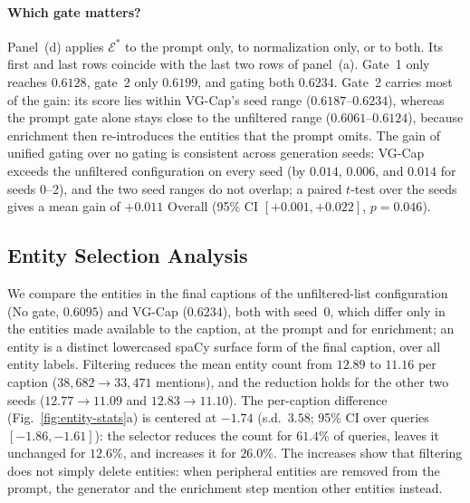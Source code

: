 \documentclass[runningheads]{llncs}
\DeclareRobustCommand{\aciids}[1]{{\color{olive}#1}}
\DeclareRobustCommand{\revise}[1]{{\color{olive}#1}}
\DeclareRobustCommand{\aciids}[1]{#1}
\DeclareRobustCommand{\revise}[1]{#1}
\begin{document}
\paragraph{\aciids{Which gate matters?}} \aciids{Panel~(d) applies $\mathcal{E}^{*}$ to the prompt only, to normalization only, or to both. Its first and last rows coincide with the last two rows of panel~(a).} Gate~1 only reaches $0.6128$, gate~2 only $0.6199$, and gating both $0.6234$. \revise{Gate~2 carries most of the gain: its score lies within VG-Cap's seed range ($0.6187$--$0.6234$), whereas the prompt gate alone stays close to the unfiltered range ($0.6061$--$0.6124$), because enrichment then re-introduces the entities that the prompt omits. The gain of unified gating over no gating is consistent across generation seeds: VG-Cap exceeds the unfiltered configuration on every seed (by $0.014$, $0.006$, and $0.014$ for seeds 0--2), and the two seed ranges do not overlap; a paired $t$-test over the seeds gives a mean gain of $+0.011$ Overall (95\% CI $[+0.001,+0.022]$, $p=0.046$).}

\subsection{Entity Selection Analysis}
\label{sec:entity-stats}

\aciids{We compare the entities in the final captions of the unfiltered-list configuration (No gate, $0.6095$) and VG-Cap ($0.6234$), both with seed~0, which differ only in the entities made available to the caption, at the prompt and for enrichment;} \revise{an entity is a distinct lowercased spaCy surface form of the final caption, over all entity labels.} Filtering reduces the mean entity count from \revise{$12.89$ to $11.16$ per caption ($38{,}682\rightarrow33{,}471$ mentions), and the reduction holds for the other two seeds ($12.77\rightarrow11.09$ and $12.83\rightarrow11.10$). The per-caption difference (Fig.~\ref{fig:entity-stats}a) is centered at $-1.74$ (s.d.\ $3.58$; 95\% CI over queries $[-1.86,-1.61]$): the selector reduces the count for $61.4\%$ of queries, leaves it unchanged for $12.6\%$, and increases it for $26.0\%$.} \aciids{The increases show that filtering does not simply delete entities: when peripheral entities are removed from the prompt, the generator and the enrichment step mention other entities instead.}
\end{document}
